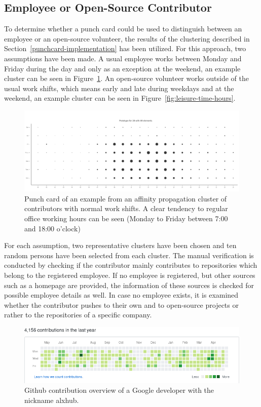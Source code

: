 \subsection{Employee or Open-Source Contributor}
To determine whether a punch card could be used to distinguish between an employee or an open-source volunteer, the results of the clustering described in Section~\ref{punchcard-implementation} has been utilized.
For this approach, two assumptions have been made.
A usual employee works between Monday and Friday during the day and only as an exception at the weekend, an example cluster can be seen in Figure~\ref{fig:normal-office-hours}.
An open-source volunteer works outside of the usual work shifts, which means early and late during weekdays and at the weekend, an example cluster can be seen in Figure~\ref{fig:leisure-time-hours}.

\begin{figure}[H]
    \includegraphics[scale=0.32]{./graphs/analysis-affinity/28}
    \centering
    \caption{Punch card of an example from an affinity propagation cluster of contributors with normal work shifts.
    A clear tendency to regular office working hours can be seen (Monday to Friday between 7:00 and 18:00 o'clock)}\label{fig:normal-office-hours}
\end{figure}

For each assumption, two representative clusters have been chosen and ten random persons have been selected from each cluster.
The manual verification is conducted by checking if the contributor mainly contributes to repositories which belong to the registered employee.
If no employee is registered, but other sources such as a homepage are provided, the information of these sources is checked for possible employee details as well.
In case no employee exists, it is examined whether the contributor pushes to their own and to open-source projects or rather to the repositories of a specific company.

\begin{figure}[H]
    \includegraphics[scale=0.6]{./graphs/contribution-overview-alxhub}
    \centering
    \caption{Github contribution overview of a Google developer with the nickname alxhub.}\label{fig:github-contribution-overview}
\end{figure}

